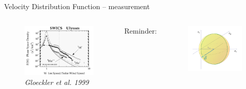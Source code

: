 \documentclass{beamer}
\begin{document}
\begin{frame}{Velocity Distribution Function -- measurement}
	\begin{columns}
	\column{6.5cm}
		\begin{figure}
			\includegraphics[scale=0.28]{pictures/sw_pui_gloeckler.png}
			\caption{\tiny{\textit{Gloeckler et al. 1999}}}
		\end{figure}
		\begin{center}
		Reminder:
		\end{center}
		\begin{figure}
			\includegraphics[scale=0.15]{pictures/vdf_3d.png}
		\end{figure}
		\vspace{1cm}
	\end{columns}
\end{frame}
\end{document}
